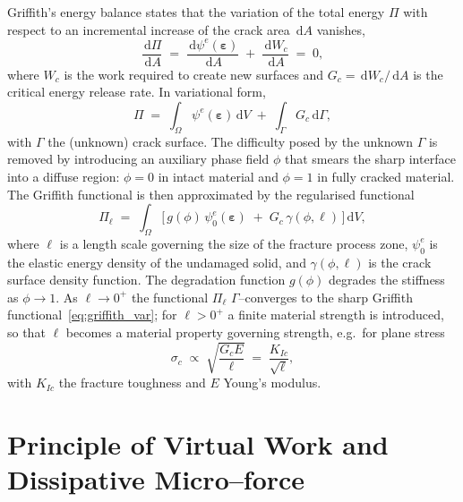 \documentclass[12pt,a4paper]{article}
\newcommand{\beps}{\boldsymbol{\varepsilon}}
\newcommand{\dd}{\,\mathrm{d}}
\begin{document}
	Griffith's energy balance states that the variation of the total energy $\Pi$
	with respect to an incremental increase of the crack area $\dd A$ vanishes,
	\begin{equation}\label{eq:griffith_dPi}
		\frac{\dd\Pi}{\dd A} \;=\; \frac{\dd\psi^e(\beps)}{\dd A} \;+\; \frac{\dd W_c}{\dd A} \;=\; 0,
	\end{equation}
	where $W_c$ is the work required to create new surfaces and
	$G_c=\dd W_c/\dd A$ is the critical energy release rate. In variational form,
	\begin{equation}\label{eq:griffith_var}
		\Pi \;=\; \int_{\Omega}\psi^e(\beps)\dd V \;+\; \int_{\Gamma}G_c\dd\Gamma,
	\end{equation}
	with $\Gamma$ the (unknown) crack surface. The difficulty posed by the unknown
	$\Gamma$ is removed by introducing an auxiliary phase field $\phi$ that smears
	the sharp interface into a diffuse region: $\phi=0$ in intact material and
	$\phi=1$ in fully cracked material. The Griffith functional is then approximated
	by the regularised functional
	\begin{equation}\label{eq:Pi_ell}
		\Pi_\ell \;=\; \int_{\Omega}\bigl[\,g(\phi)\,\psi^e_0(\beps) \;+\; G_c\,\gamma(\phi,\ell)\,\bigr]\dd V,
	\end{equation}
	where $\ell$ is a length scale governing the size of the fracture process zone,
	$\psi^e_0$ is the elastic energy density of the undamaged solid, and
	$\gamma(\phi,\ell)$ is the crack surface density function. The degradation
	function $g(\phi)$ degrades the stiffness as $\phi\to 1$. As $\ell\to 0^+$ the
	functional $\Pi_\ell$ $\Gamma$--converges to the sharp Griffith
	functional~\eqref{eq:griffith_var}; for $\ell>0^+$ a finite material strength
	is introduced, so that $\ell$ becomes a material property governing strength,
	e.g.\ for plane stress
	\begin{equation}\label{eq:sigc}
		\sigma_c \;\propto\; \sqrt{\frac{G_c E}{\ell}} \;=\; \frac{K_{Ic}}{\sqrt{\ell}},
	\end{equation}
	with $K_{Ic}$ the fracture toughness and $E$ Young's modulus.

	\section{Principle of Virtual Work and Dissipative Micro--force}\label{sec:vw}
\end{document}
